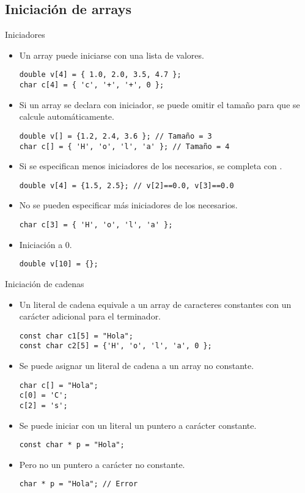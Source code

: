 \subsection{Iniciación de arrays}

\begin{frame}[fragile]{Iniciadores}
\vspace{-0.5em}
\begin{itemize}
  \item Un array puede iniciarse con una lista de valores.
\begin{lstlisting}
double v[4] = { 1.0, 2.0, 3.5, 4.7 };
char c[4] = { 'c', '+', '+', 0 };
\end{lstlisting}
  \item Si un array se declara con iniciador, se puede omitir el tamaño para
        que se calcule automáticamente.
\begin{lstlisting}
double v[] = {1.2, 2.4, 3.6 }; // Tamaño = 3
char c[] = { 'H', 'o', 'l', 'a' }; // Tamaño = 4
\end{lstlisting}
  \item Si se especifican menos iniciadores de los necesarios, se completa con .
\begin{lstlisting}
double v[4] = {1.5, 2.5}; // v[2]==0.0, v[3]==0.0
\end{lstlisting}
  \item No se pueden especificar más iniciadores de los necesarios.
\begin{lstlisting}
char c[3] = { 'H', 'o', 'l', 'a' };
\end{lstlisting}
  \item Iniciación a 0.
\begin{lstlisting}
double v[10] = {};
\end{lstlisting}
\end{itemize}
\end{frame}

\begin{frame}[fragile]{Iniciación de cadenas}
\begin{itemize}
  \item Un literal de cadena equivale a un array de caracteres constantes con un carácter adicional para el terminador. 
\begin{lstlisting}
const char c1[5] = "Hola";
const char c2[5] = {'H', 'o', 'l', 'a', 0 };
\end{lstlisting}
  \item Se puede asignar un literal de cadena a un array no constante.
\begin{lstlisting}
char c[] = "Hola";
c[0] = 'C';
c[2] = 's';
\end{lstlisting}
  \item Se puede iniciar con un literal un puntero a carácter constante.
\begin{lstlisting}
const char * p = "Hola";
\end{lstlisting}
  \item Pero no un puntero a carácter no constante.
\begin{lstlisting}
char * p = "Hola"; // Error
\end{lstlisting}
\end{itemize}
\end{frame}


